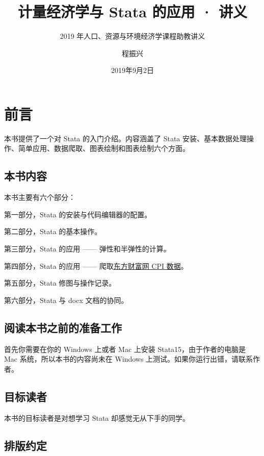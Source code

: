 \documentclass[cn,fancy,blue,11pt]{elegantbook}
\title{计量经济学与 Stata 的应用 · 讲义}
\subtitle{2019 年人口、资源与环境经济学课程助教讲义}
\author{程振兴}
\institute{https://www.czxa.top}
\date{2019年9月2日}
\begin{document}
\maketitle
\tableofcontents

\mainmatter
\hypersetup{pageanchor=true}

\hypertarget{section}{%
\chapter{前言}\label{section}}

本书提供了一个对 Stata 的入门介绍。内容涵盖了 Stata 安装、基本数据处理操作、简单应用、数据爬取、图表绘制和图表绘制六个方面。

\hypertarget{section-1}{%
\section{本书内容}\label{section-1}}

本书主要有六个部分：

第一部分，Stata 的安装与代码编辑器的配置。

第二部分，Stata 的基本操作。

第三部分，Stata 的应用 ------ 弹性和半弹性的计算。

第四部分，Stata 的应用 ------ 爬取\href{http://data.eastmoney.com/cjsj/cpi.html}{东方财富网 CPI 数据}。

第五部分，Stata 修图与操作记录。

第六部分，Stata 与 docx 文档的协同。

\hypertarget{section-2}{%
\section{阅读本书之前的准备工作}\label{section-2}}

首先你需要在你的 Windows 上或者 Mac 上安装 Stata15，由于作者的电脑是 Mac 系统，所以本书的内容尚未在 Windows 上测试。如果你运行出错，请联系作者。

\hypertarget{section-3}{%
\section{目标读者}\label{section-3}}

本书的目标读者是对想学习 Stata 却感觉无从下手的同学。

\hypertarget{section-4}{%
\section{排版约定}\label{section-4}}
\end{document}
